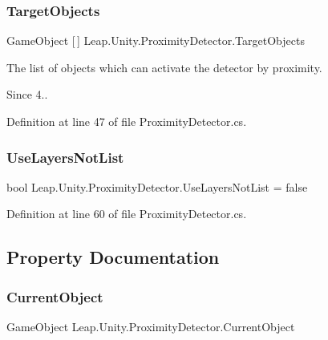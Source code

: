 \subsubsection{\texorpdfstring{TargetObjects}{TargetObjects}}
{\footnotesize\ttfamily Game\+Object \mbox{[}$\,$\mbox{]} Leap.\+Unity.\+Proximity\+Detector.\+Target\+Objects}

The list of objects which can activate the detector by proximity. \begin{DoxySince}{Since}
4.. 
\end{DoxySince}


Definition at line 47 of file Proximity\+Detector.\+cs.

\mbox{\label{class_leap_1_1_unity_1_1_proximity_detector_ace1a6d3060bc3f78861eccb6bd1bd612}} 
\subsubsection{\texorpdfstring{UseLayersNotList}{UseLayersNotList}}
{\footnotesize\ttfamily bool Leap.\+Unity.\+Proximity\+Detector.\+Use\+Layers\+Not\+List = false}



Definition at line 60 of file Proximity\+Detector.\+cs.



\subsection{Property Documentation}
\mbox{\label{class_leap_1_1_unity_1_1_proximity_detector_acc3c0aa94505f393b7a458c4dc0e482e}} 
\subsubsection{\texorpdfstring{CurrentObject}{CurrentObject}}
{\footnotesize\ttfamily Game\+Object Leap.\+Unity.\+Proximity\+Detector.\+Current\+Object\hspace{0.3cm}{\ttfamily [get]}}

